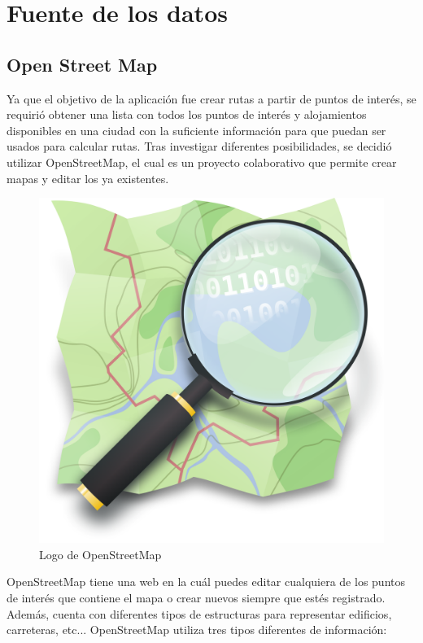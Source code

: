 \section[Fuente de los datos]{Fuente de los datos}
\subsection[OSM]{Open Street Map}
Ya que el objetivo de la aplicación fue crear rutas a partir de puntos de interés, se requirió obtener una lista con todos los puntos de interés y alojamientos disponibles en una ciudad con la suficiente información para que puedan ser usados para calcular rutas.\newline
Tras investigar diferentes posibilidades, se decidió utilizar OpenStreetMap, el cual es un proyecto colaborativo que permite crear mapas y editar los ya existentes.\newline
\begin{figure}[H]
	\centering
	\includegraphics[scale=0.05]{imagenes/Openstreetmap_logo}
	\caption{Logo de OpenStreetMap}
	\label{fig:openstreetmap}
\end{figure}
OpenStreetMap tiene una web \cite{openstreetmap} en la cuál puedes editar cualquiera de los puntos de interés que contiene el mapa o crear nuevos siempre que estés registrado. Además, cuenta con diferentes tipos de estructuras para representar edificios, carreteras, etc... OpenStreetMap utiliza tres tipos diferentes de información:\newline
